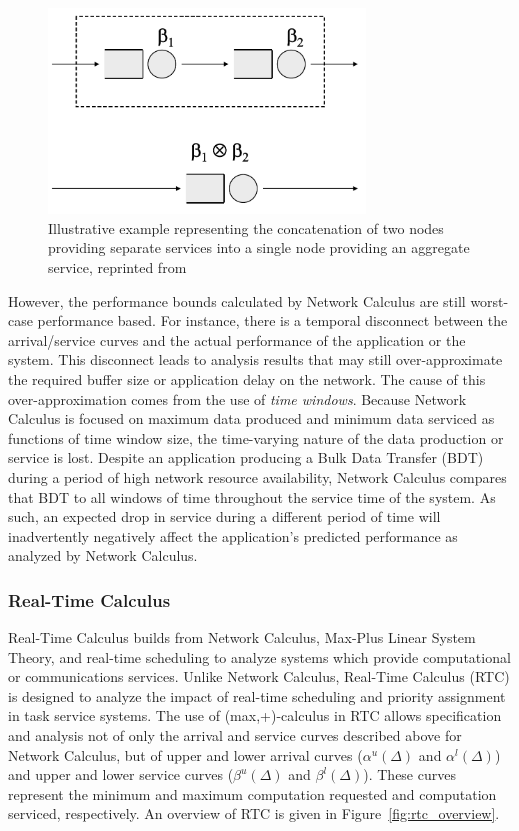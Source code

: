 \begin{figure}[htb]
  \centering
  \includegraphics[width=0.75\textwidth]{figs/nc_concatenation.png}
  \caption{Illustrative example representing the concatenation of two
    nodes providing separate services into a single node providing an
    aggregate service, reprinted from \cite{NCBook}}
  \label{fig:nc_concatenation}
\end{figure}

However, the performance bounds calculated by Network Calculus are
still worst-case performance based.  For instance, there is a temporal
disconnect between the arrival/service curves and the actual
performance of the application or the system.  This disconnect leads
to analysis results that may still over-approximate the required
buffer size or application delay on the network.  The cause of this
over-approximation comes from the use of \emph{time windows}.  Because
Network Calculus is focused on maximum data produced and minimum data
serviced as functions of time window size, the time-varying nature of
the data production or service is lost.  Despite an application
producing a Bulk Data Transfer (BDT) during a period of high network
resource availability, Network Calculus compares that BDT to all
windows of time throughout the service time of the system.  As such,
an expected drop in service during a different period of time will
inadvertently negatively affect the application's predicted
performance as analyzed by Network Calculus.

\subsubsection{Real-Time Calculus}
\label{subsec:rtc}
Real-Time Calculus\cite{Thiele00real-timecalculus} builds from Network
Calculus, Max-Plus Linear System Theory, and real-time scheduling to
analyze systems which provide computational or communications
services.  Unlike Network Calculus, Real-Time Calculus (RTC) is
designed to analyze the impact of real-time scheduling and priority
assignment in task service systems.  The use of (max,+)-calculus in
RTC allows specification and analysis not of only the arrival and
service curves described above for Network Calculus, but of upper and
lower arrival curves ($\alpha^u(\Delta)$ and $\alpha^l(\Delta)$) and
upper and lower service curves ($\beta^u(\Delta)$ and
$\beta^l(\Delta)$).  These curves represent the minimum and maximum
computation requested and computation serviced, respectively.  An
overview of RTC is given in Figure~\ref{fig:rtc_overview}.

